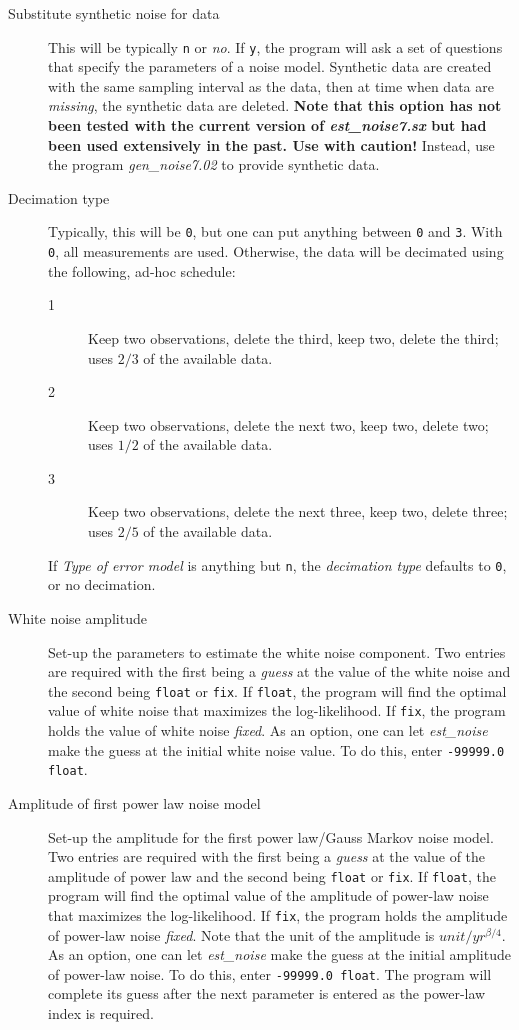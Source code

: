 \documentclass[12pt]{amsart}
\begin{document}
\begin{description}
\item[Substitute synthetic noise for data]  This will be typically \texttt{n} or \textit{no}.  If \texttt{y}, the program will
ask a set of questions that specify the parameters of a noise model. Synthetic data are created with the same
sampling interval as the data, then at time when data are \textit{missing}, the synthetic data are deleted. \textbf{Note that
this option has not been tested with the current version of \textit{est\_noise7.sx} but had been used extensively in
the past. Use with caution!}  Instead, use the program \textit{gen\_noise7.02} to provide synthetic data.

\item[Decimation type]  Typically, this will be \texttt{0}, but one can put anything between \texttt{0} and \texttt{3}.
With \texttt{0}, all measurements are used.  Otherwise, the data will be decimated using the following, ad-hoc schedule:
\begin{description}
\item[1]  Keep two observations, delete the third, keep two, delete the third; uses $2/3$ of the available data.
\item[2] Keep two observations, delete the next two, keep two, delete two; uses $1/2$ of the available data.
\item[3] Keep two observations, delete the next three, keep two, delete three; uses $2/5$ of the available data.
\end{description}
If \textit{Type of error model} is anything but \texttt{n}, the \textit{decimation type} defaults to \texttt{0}, or no decimation.

\item[White noise amplitude] Set-up the parameters to estimate the white noise component. Two entries are required
with the first being a \textit{guess} at the value of the white noise and the second being \texttt{float} or \texttt{fix}.
If \texttt{float}, the program will find the optimal value of white noise that maximizes the log-likelihood. If \texttt{fix},
the program holds the value of white noise \textit{fixed}.  As an option, one can let \textit{est\_noise} make the guess
at the initial white noise value.  To do this, enter \texttt{-99999.0 float}.

\item[Amplitude of first power law noise model] Set-up the amplitude for the first power law/Gauss Markov noise model. Two entries are required
with the first being a \textit{guess} at the value of the amplitude of power law and the second being \texttt{float} or \texttt{fix}.
If \texttt{float}, the program will find the optimal value of the amplitude of power-law noise that maximizes the log-likelihood. If \texttt{fix},
the program holds the amplitude of power-law noise \textit{fixed}.  Note that the unit of the amplitude is $unit/{yr^{{\beta}/4}}$.
As an option, one can let \textit{est\_noise} make the guess
at the initial amplitude of power-law noise.  To do this, enter \texttt{-99999.0 float}.  The program will complete its guess
after the next parameter is entered as the power-law index is required.


\end{description}
\end{document}
